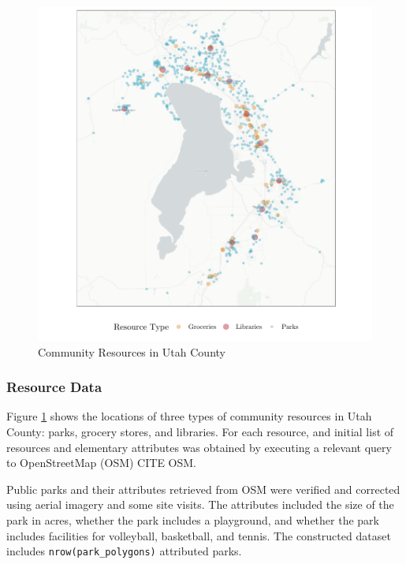 \documentclass[3p, authoryear]{elsarticle} %
\begin{document}
\begin{figure}

{\centering \includegraphics{Community_Resources_files/figure-latex/utco-map-1} 

}

\caption{Community Resources in Utah County}\label{fig:utco-map}
\end{figure}

\hypertarget{resource-data}{%
\subsubsection{Resource Data}\label{resource-data}}

Figure \ref{fig:utco-map} shows the locations of three types of
community resources in Utah County: parks, grocery stores, and libraries.
For each resource, and initial list of resources and elementary attributes was
obtained by executing a relevant query to OpenStreetMap (OSM) CITE OSM.

Public parks and their attributes retrieved from OSM were verified and
corrected using aerial imagery and some site visits. The attributes included
the size of the park in acres, whether the park includes a playground, and
whether the park includes facilities for volleyball, basketball, and tennis.
The constructed dataset includes \texttt{nrow(park\_polygons)} attributed parks.
\end{document}
